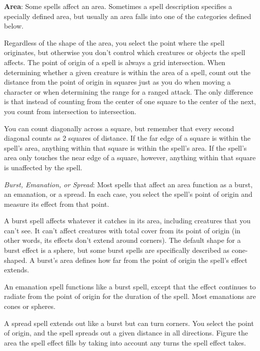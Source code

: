 \begin{figure}
\end{figure}

\textbf{Area}: Some spells affect an area. Sometimes a spell description specifies a specially defined area, but usually an area falls into one of the categories defined below.
				
Regardless of the shape of the area, you select the point where the spell originates, but otherwise you don't control which creatures or objects the spell affects. The point of origin of a spell is always a grid intersection. When determining whether a given creature is within the area of a spell, count out the distance from the point of origin in squares just as you do when moving a character or when determining the range for a ranged attack. The only difference is that instead of counting from the center of one square to the center of the next, you count from intersection to intersection.
				
You can count diagonally across a square, but remember that every second diagonal counts as 2 squares of distance. If the far edge of a square is within the spell's area, anything within that square is within the spell's area. If the spell's area only touches the near edge of a square, however, anything within that square is unaffected by the spell.
				
\textit{Burst, Emanation, or Spread}: Most spells that affect an area function as a burst, an emanation, or a spread. In each case, you select the spell's point of origin and measure its effect from that point.
				
A burst spell affects whatever it catches in its area, including creatures that you can't see. It can't affect creatures with total cover from its point of origin (in other words, its effects don't extend around corners). The default shape for a burst effect is a sphere, but some burst spells are specifically described as cone-shaped. A burst's area defines how far from the point of origin the spell's effect extends.
				
An emanation spell functions like a burst spell, except that the effect continues to radiate from the point of origin for the duration of the spell. Most emanations are cones or spheres.
				
A spread spell extends out like a burst but can turn corners. You select the point of origin, and the spell spreads out a given distance in all directions. Figure the area the spell effect fills by taking into account any turns the spell effect takes.
				
